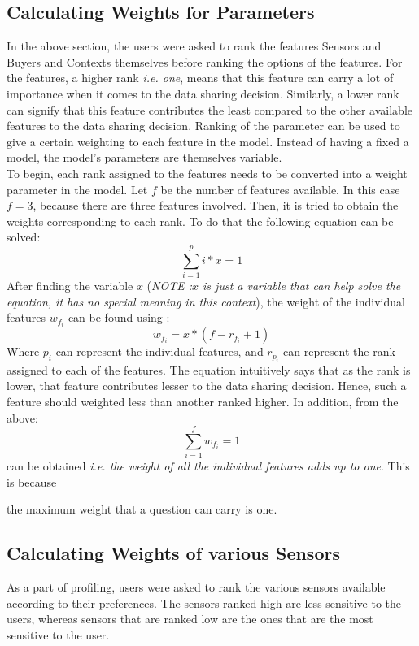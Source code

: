 \subsection{Calculating Weights for Parameters}
In the above section, the users were asked to rank the features Sensors and Buyers and Contexts themselves before ranking the options of the features. For the features, a higher rank {\it i.e. one}, means that this feature can carry a lot of
importance when it comes to the data sharing decision. Similarly, a lower rank can signify that this feature contributes the least compared to the other available features to the data sharing decision. 
Ranking of the parameter can be used to give a certain weighting to each feature in the model. Instead of having a fixed a model, the model's parameters are themselves variable.\\
To begin, each rank assigned to the features needs to be converted into a weight parameter in the model. Let $f$ be the number of features available. In this case $f=3$, because there are three features involved. Then, it is tried to obtain the 
weights corresponding to each rank. To do that the following equation can be solved:
$$\sum^{p}_{i=1} i*x = 1$$
After finding the variable $x$ ({\it NOTE :$x$ is just a variable that can help solve the equation, it has no special meaning in this context}), the weight of the individual features $w_{f_{i}}$ can be found using :
$$w_{f_{i}} = x* (f - r_{f_{i}} + 1)$$
Where $p_{i}$ can represent the individual features, and $r_{p_{i}}$ can represent the rank assigned to each of the features. The equation intuitively says that
as the rank is lower, that feature contributes lesser to the data sharing decision. Hence, such a feature should weighted less than another ranked higher.
In addition, from the above: $$\sum^{f}_{i=1} w_{f_{i}} = 1$$ can be obtained {\it i.e. the weight of all the individual features adds up to one}. This is because

the maximum weight that a question can carry is one.

\subsection{Calculating Weights of various Sensors}
As a part of profiling, users were asked to rank the various sensors available according to their preferences. The sensors ranked high are less sensitive
to the users, whereas sensors that are ranked low are the ones that are the most sensitive to the user.\\

